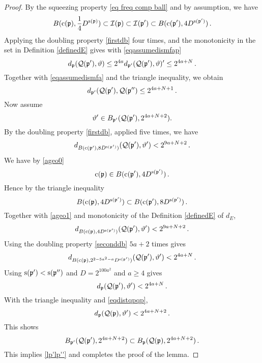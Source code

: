 \begin{proof}
    By the squeezing property \eqref{eq freq comp ball}
    and by assumption, we have
\begin{equation}\label{ageo0}
    B(\mathrm{c}(\mathfrak p), \frac 14 D^{\mathrm{s}(\mathfrak p)})\subset \mathcal{I}(\mathfrak p)\subset \mathcal{I}(\mathfrak p')
    \subset B(\mathrm{c}(\mathfrak p'),  4D^{\mathrm{s}(\mathfrak p')})\, .
\end{equation}
    Applying the doubling property \eqref{firstdb} four times, and the monotonicity in
    the set in Definition \eqref{definedE} gives with
    \eqref{eqassumedismfap}
\begin{equation}
        d_{\mathfrak p}(\mathcal{Q}(\mathfrak p'),\vartheta)
        \le 2^{4a} d_{\mathfrak p'}(\mathcal{Q}(\mathfrak p'),\vartheta)'
        \le  2^{4a+N} \, .
\end{equation}
Together with \eqref{eqassumedismfa} and the triangle inequality, we obtain
\begin{equation}\label{eqdistqpqp}
    d_{\mathfrak p'}(\mathcal{Q}(\mathfrak p'),\mathcal{Q}(\mathfrak p'')\le 2^{4a+N+1}  \, .
\end{equation}
Now assume
\begin{equation}
    \vartheta'\in B_{\mathfrak p'}(\mathcal{Q}(\mathfrak p'),2^{4a+N+2}).
\end{equation}
By the doubling property \eqref{firstdb}, applied five times, we have
\begin{equation}\label{ageo1}    d_{B(\mathrm{c}(\mathfrak p'),8D^{\mathrm{s}(\mathfrak p')})}(\mathcal{Q}(\mathfrak p'),\vartheta') < 2^{9a+N+2}\, .
\end{equation}
We have by \eqref{ageo0}
\begin{equation}
    \mathrm{c}(\mathfrak p)\in
B(\mathrm{c}(\mathfrak p'),4D^{\mathrm{s}(\mathfrak p')})\, .
\end{equation}
Hence by the triangle inequality
\begin{equation}
    B(\mathrm{c}(\mathfrak p), 4D^{\mathrm{s}(\mathfrak p')})
    \subset
B(\mathrm{c}(\mathfrak p'),8D^{\mathrm{s}(\mathfrak p')})\, .
\end{equation}
Together with \eqref{ageo1} and   monotonicity of the Definition \eqref{definedE}
of $d_E$,
\begin{equation}
    d_{B(\mathrm{c}(\mathfrak p),4D^{\mathrm{s}(\mathfrak p')})}(\mathcal{Q}(\mathfrak p'),\vartheta') < 2^{9a+N+2}\, .
\end{equation}
Using the doubling property \eqref{seconddb} $5a+2$ times  gives
\begin{equation}
    d_{B(\mathrm{c}(\mathfrak p),2^{2-5a^2-a}D^{\mathrm{s}(\mathfrak p')})}(\mathcal{Q}(\mathfrak p'),\vartheta') < 2^{4a+N}\, .
\end{equation}
Using $\mathrm{s}(\mathfrak p')<\mathrm{s}(\mathfrak p'')$ and $D=2^{100a^2}$ and $a\ge 4$ gives
\begin{equation}
    d_{\mathfrak p}(\mathcal{Q}(\mathfrak p'),\vartheta') < 2^{4a+N}\, .
\end{equation}
With the triangle inequality and \eqref{eqdistqpqp},
\begin{equation}
    d_{\mathfrak p}(\mathcal{Q}(\mathfrak p),\vartheta') < 2^{4a+N+2}\, .
\end{equation}
This shows
\begin{equation}
B_{\mathfrak p'}(\mathcal{Q}(\mathfrak p'),2^{4a+N+2})\subset    B_{\mathfrak p}(\mathcal{Q}(\mathfrak p),2^{4a+N+2})\, .
\end{equation}
This implies  \eqref{lp'lp''} and completes the proof of the lemma.

\end{proof}

